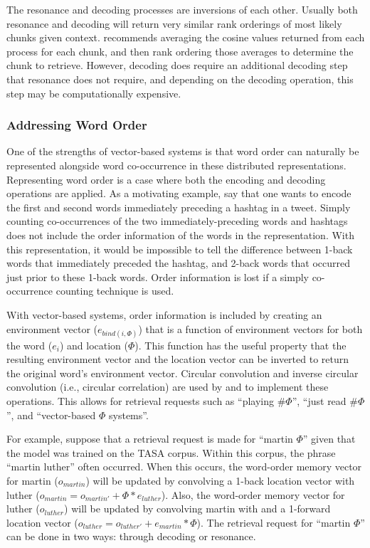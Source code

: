 \documentclass[man,floatsintext,donotrepeattitle]{apa6}
\begin{document}
The resonance and decoding processes are inversions of each other.
Usually both resonance and decoding will return very similar rank orderings of most likely chunks given context.
\textcite{Jones2007} recommends averaging the cosine values returned from each process for each chunk, and then rank ordering those averages to determine the chunk to retrieve.
However, decoding does require an additional decoding step that resonance does not require, and depending on the decoding operation, this step may be computationally expensive.

\subsubsection{Addressing Word Order}

One of the strengths of vector-based systems is that word order can naturally be represented alongside word co-occurrence in these distributed representations.
Representing word order is a case where both the encoding and decoding operations are applied.
As a motivating example, say that one wants to encode the first and second words immediately preceding a hashtag in a tweet.
Simply counting co-occurrences of the two immediately-preceding words and hashtags does not include the order information of the words in the representation.
With this representation, it would be impossible to tell the difference between 1-back words that immediately preceded the hashtag, and 2-back words that occurred just prior to these 1-back words.
Order information is lost if a simply co-occurrence counting technique is used.

With vector-based systems, order information is included by creating an environment vector ($e_{bind(i,\Phi)}$) that is a function of environment vectors for both the word ($e_{i}$) and location ($\Phi$).
This function has the useful property that the resulting environment vector and the location vector can be inverted to return the original word's environment vector.
Circular convolution and inverse circular convolution (i.e., circular correlation) are used by \textcite{Plate1995} and \textcite{Jones2007} to implement these operations.
This allows for retrieval requests such as ``playing \#$\Phi$'', ``just read \#$\Phi$'', and ``vector-based $\Phi$ systems''.

For example, suppose that a retrieval request is made for ``martin $\Phi$'' given that the model was trained on the TASA corpus.
Within this corpus, the phrase ``martin luther'' often occurred.
When this occurs, the word-order memory vector for martin ($o_{martin}$) will be updated by convolving a 1-back location vector with luther ($o_{martin} = o_{martin'} + \Phi * e_{luther}$).
Also, the word-order memory vector for luther ($o_{luther}$) will be updated by convolving martin with and a 1-forward location vector ($o_{luther} = o_{luther'} + e_{martin} * \Phi$).
The retrieval request for ``martin $\Phi$'' can be done in two ways: through decoding or resonance.
\end{document}
